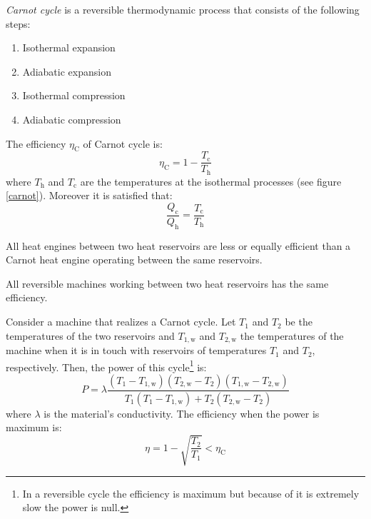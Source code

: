 \documentclass[../../../main.tex]{subfiles}
\begin{document}
\begin{multicols}{2}
\begin{center}
\begin{minipage}{0.49\linewidth}
        \end{minipage}
    \end{center}
    \begin{definition}
        \textit{Carnot cycle} is a reversible thermodynamic process that consists of the following steps:
        \begin{enumerate}
            \item Isothermal expansion
            \item Adiabatic expansion
            \item Isothermal compression
            \item Adiabatic compression
        \end{enumerate}
        The efficiency $\eta_\text{C}$ of Carnot cycle is:
        $$\eta_\text{C}=1-\frac{T_\text{c}}{T_\text{h}}$$
        where $T_\text{h}$ and $T_\text{c}$ are the temperatures at the isothermal processes (see figure \ref{carnot}). Moreover it is satisfied that: $$\frac{Q_\text{c}}{Q_\text{h}}=\frac{T_\text{c}}{T_\text{h}}$$
        \begin{center}
            \begin{minipage}{\linewidth}
                \centering
                
                \label{carnot}
            \end{minipage}
        \end{center}
    \end{definition}
    \begin{theorem}
        All heat engines between two heat reservoirs are less or equally efficient than a Carnot heat engine operating between the same reservoirs.
    \end{theorem}
    \begin{corollary}
        All reversible machines working between two heat reservoirs has the same efficiency.
    \end{corollary}
    \begin{prop}
        Consider a machine that realizes a Carnot cycle. Let $T_1$ and $T_2$ be the temperatures of the two reservoirs and $T_{1,\text{w}}$ and $T_{2,\text{w}}$ the temperatures of the machine when it is in touch with reservoirs of temperatures $T_1$ and $T_2$, respectively. Then, the power of this cycle\footnote{In a reversible cycle the efficiency is maximum but because of it is extremely slow the power is null. } is:
        $$P=\lambda\frac{(T_1-T_{1,\text{w}})(T_{2,\text{w}}-T_2)(T_{1,\text{w}}-T_{2,\text{w}})}{T_1(T_1-T_{1,\text{w}})+T_2(T_{2,\text{w}}-T_2)}$$
        where $\lambda$ is the material’s conductivity. The efficiency when the power is maximum is:
        $$\eta=1-\sqrt{\frac{T_2}{T_1}}<\eta_\text{C}$$
    \end{prop}

\end{multicols}
\end{document}
